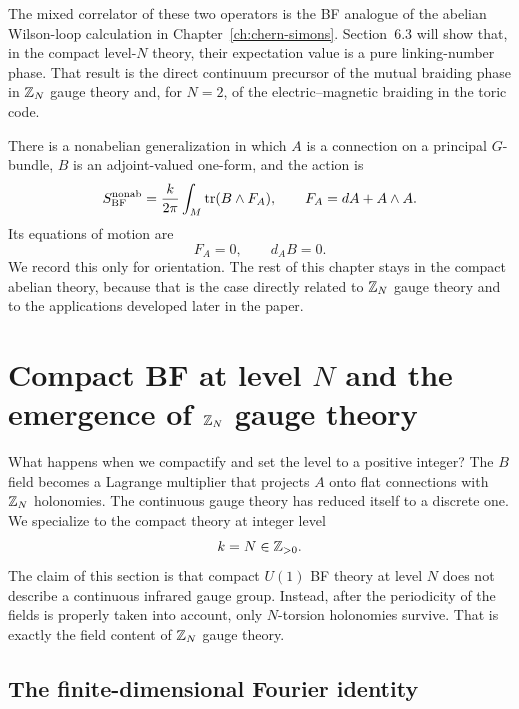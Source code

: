 \noindent The mixed correlator of these two operators is the BF analogue of the abelian Wilson-loop calculation in Chapter~\ref{ch:chern-simons}. Section~6.3 will show that, in the compact level-$N$ theory, their expectation value is a pure linking-number phase. That result is the direct continuum precursor of the mutual braiding phase in $\mathbb{Z}_N$ gauge theory and, for $N=2$, of the electric--magnetic braiding in the toric code.

\begin{remark}\label{rem:nonabelian-bf}
There is a nonabelian generalization in which $A$ is a connection on a principal $G$-bundle, $B$ is an adjoint-valued one-form, and the action is
\begin{equation*}
S_{\mathrm{BF}}^{\mathrm{nonab}}
=
\frac{k}{2\pi}\int_M \operatorname{tr}(B\wedge F_A),
\qquad
F_A = dA + A\wedge A.
\end{equation*}
Its equations of motion are
\begin{equation*}
F_A=0,
\qquad
d_A B = 0.
\end{equation*}
We record this only for orientation. The rest of this chapter stays in the compact abelian theory, because that is the case directly related to $\mathbb{Z}_N$ gauge theory and to the applications developed later in the paper.
\end{remark}

\section{Compact BF at level \texorpdfstring{$N$}{N} and the emergence of \texorpdfstring{$\mathbb{Z}_N$}{Z\_N} gauge theory}\label{sec:bf-zn}

What happens when we compactify and set the level to a positive integer?  The $B$ field becomes a Lagrange multiplier that projects $A$ onto flat connections with $\mathbb{Z}_N$ holonomies.  The continuous gauge theory has reduced itself to a discrete one.  We specialize to the compact theory at integer level
\begin{equation*}
k=N\in \mathbb{Z}_{>0}.
\end{equation*}
The claim of this section is that compact $U(1)$ BF theory at level $N$ does not describe a continuous infrared gauge group. Instead, after the periodicity of the fields is properly taken into account, only $N$-torsion holonomies survive. That is exactly the field content of $\mathbb{Z}_N$ gauge theory.

\subsection{The finite-dimensional Fourier identity}

